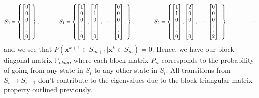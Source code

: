 \documentclass[superscriptaddress]{revtex4-1}
\newcommand{\prob}{\mathbb{P}}
\begin{document}
\begin{align*}
S_0 = 
\left\{
\begin{bmatrix}
0 \\ 0 \\ 0 \\ \vdots \\ 0
\end{bmatrix}
\right\},
\hspace{.5in}
S_1 = 
\left\{
\begin{bmatrix}
1 \\ 0 \\ 0 \\ \vdots \\ 0
\end{bmatrix},
\begin{bmatrix}
0 \\ 1 \\ 0 \\ \vdots \\ 0
\end{bmatrix},
\dotsm,
\begin{bmatrix}
0 \\ 0 \\ 0 \\ \vdots \\ 1
\end{bmatrix},
\right\},
\hspace{.5in}
S_2 = 
\left\{
\begin{bmatrix}
1 \\ 1 \\ 0 \\ \vdots \\ 0
\end{bmatrix},
\begin{bmatrix}
2 \\ 0 \\ 0 \\ \vdots \\ 0
\end{bmatrix},
\dotsm,
\begin{bmatrix}
0 \\ 0 \\ 0 \\ \vdots \\ 2
\end{bmatrix},
\right\},
\hspace{.5in}
\dotsm
\end{align*}
and we see that $P(\bm{x}^{k+1} \in S_{m+1} | \bm{x}^k \in S_m) = 0$. Hence, we have our block diagonal matrix $\prob_{okay}$, where each block matrix $P_{ii}$ corresponds to the probability of going from any state in $S_i$ to any other state in $S_i$. All transitions from $S_i \rightarrow S_{i-1}$ don't contribute to the eigenvalues due to the block triangular matrix property outlined previously.
\end{document}
